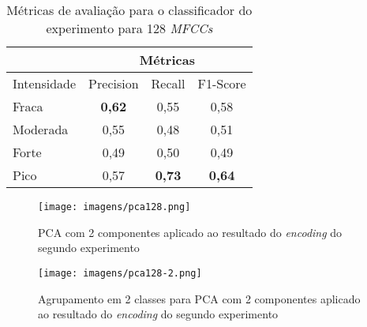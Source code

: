 \begin{table}[h]
    \centering
    \begin{tabular}{l|ccc|}
        \cline{2-4}
                                          & \multicolumn{3}{c|}{Métricas}                                                               \\ \hline
        \multicolumn{1}{|l|}{Intensidade} & \multicolumn{1}{c|}{Precision}      & \multicolumn{1}{c|}{Recall}           & F1-Score      \\ \hline
        \multicolumn{1}{|l|}{Fraca}       & \multicolumn{1}{c|}{\textbf{0,62}}  & \multicolumn{1}{c|}{0,55}             & 0,58          \\ \hline
        \multicolumn{1}{|l|}{Moderada}    & \multicolumn{1}{c|}{0,55}           & \multicolumn{1}{c|}{0,48}             & 0,51          \\ \hline
        \multicolumn{1}{|l|}{Forte}       & \multicolumn{1}{c|}{0,49}           & \multicolumn{1}{c|}{0,50}              & 0,49          \\ \hline
        \multicolumn{1}{|l|}{Pico}        & \multicolumn{1}{c|}{0,57}           & \multicolumn{1}{c|}{\textbf{0,73}}    & \textbf{0,64} \\ \hline
    \end{tabular}
        \caption{\label{table:metricasclf128}Métricas de avaliação para o classificador do experimento para 128 \textit{MFCCs}}
\end{table}

\clearpage

\begin{landscape}
\begin{figure}[h]
    \centering
    \texttt{[image: imagens/pca128.png]}
    \caption{\label{fig:pca128}PCA com 2 componentes aplicado ao resultado do \textit{encoding} do segundo experimento}
\end{figure}
\end{landscape}

\begin{landscape}
\begin{figure}[h]
    \centering
    \texttt{[image: imagens/pca128-2.png]}
    \caption{\label{fig:pca128-2}Agrupamento em 2 classes para PCA com 2 componentes aplicado ao resultado do \textit{encoding} do segundo experimento}
\end{figure}
\end{landscape}

\clearpage

